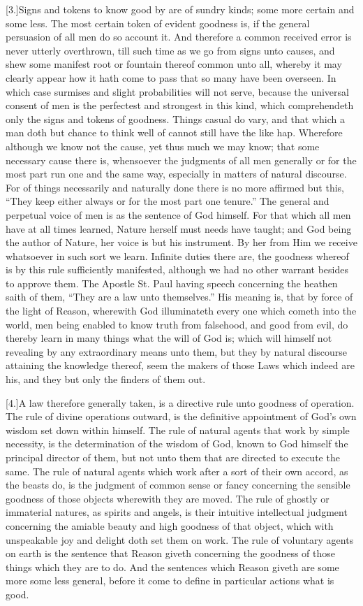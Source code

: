 [3.]Signs and tokens to know good by are of sundry kinds; some more certain and some less. The most certain token of evident goodness is, if the general persuasion of all men do so account it. And therefore a common received error is never utterly overthrown, till such time as we go from signs unto causes, and shew some manifest root or fountain thereof common unto all, whereby it may clearly appear how it hath come to pass that so many have been overseen. In which case surmises and slight probabilities will not serve, because the universal consent of men is the perfectest and strongest in this kind, which comprehendeth  only the signs and tokens of goodness. Things casual do vary, and that which a man doth but chance to think well of cannot still have the like hap. Wherefore although we know not the cause, yet thus much we may know; that some necessary cause there is, whensoever the judgments of all men generally or for the most part run one and the same way, especially in matters of natural discourse. For of things necessarily and naturally done there is no more affirmed but this, “They keep either always or for the most part one tenure.” The general and perpetual voice of men is as the sentence of God himself. For that which all men have at all times learned, Nature herself must needs have taught; and God being the author of Nature, her voice is but his instrument. By her from Him we receive whatsoever in such sort we learn. Infinite duties there are, the goodness whereof is by this rule sufficiently manifested, although we had no other warrant besides to approve them. The Apostle St. Paul having speech concerning the heathen saith of them, “They are a law unto themselves.” His meaning is, that by force of the light of Reason, wherewith God illuminateth every one which cometh into the world, men being enabled to know truth from falsehood,  and good from evil, do thereby learn in many things what the will of God is; which will himself not revealing by any extraordinary means unto them, but they by natural discourse attaining the knowledge thereof, seem the makers of those Laws which indeed are his, and they but only the finders of them out.

[4.]A law therefore generally taken, is a directive rule unto goodness of operation. The rule of divine operations outward, is the definitive appointment of God’s own wisdom set down within himself. The rule of natural agents that work by simple necessity, is the determination of the wisdom of God, known to God himself the principal director of them, but not unto them that are directed to execute the same. The rule of natural agents which work after a sort of their own accord, as the beasts do, is the judgment of common sense or fancy concerning the sensible goodness of those objects wherewith they are moved. The rule of ghostly or immaterial natures, as spirits and angels, is their intuitive intellectual judgment concerning the amiable beauty and high goodness of that object, which with unspeakable joy and delight doth set them on work. The rule of voluntary agents on earth is the sentence that Reason giveth concerning the goodness of those things which they are to do. And the sentences which Reason giveth are some more some less general, before it come to define in particular actions what is good.

